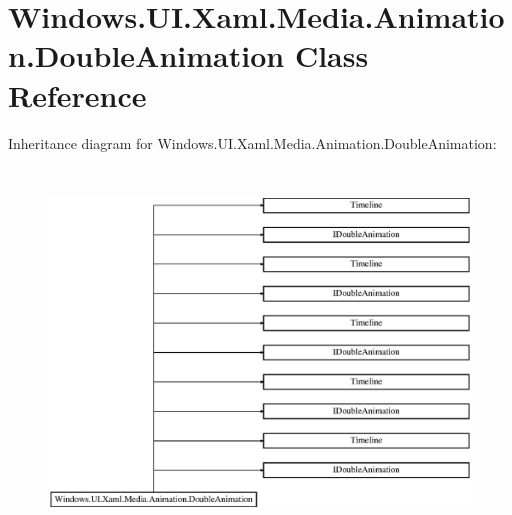 \hypertarget{class_windows_1_1_u_i_1_1_xaml_1_1_media_1_1_animation_1_1_double_animation}{}\section{Windows.\+U\+I.\+Xaml.\+Media.\+Animation.\+Double\+Animation Class Reference}
\label{class_windows_1_1_u_i_1_1_xaml_1_1_media_1_1_animation_1_1_double_animation}
Inheritance diagram for Windows.\+U\+I.\+Xaml.\+Media.\+Animation.\+Double\+Animation\+:\begin{figure}[H]
\begin{center}
\leavevmode
\includegraphics[height=9.808917cm]{class_windows_1_1_u_i_1_1_xaml_1_1_media_1_1_animation_1_1_double_animation}
\end{center}
\end{figure}
